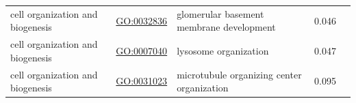 \documentclass[
]{article}
\begin{document}
\begin{longtable}[]{@{}lllll@{}}
\begin{minipage}[t]{0.17\columnwidth}\raggedright
cell organization and biogenesis\strut
\end{minipage} & \begin{minipage}[t]{0.17\columnwidth}\raggedright
\url{GO:0032836}\strut
\end{minipage} & \begin{minipage}[t]{0.17\columnwidth}\raggedright
glomerular basement membrane development\strut
\end{minipage} & \begin{minipage}[t]{0.17\columnwidth}\raggedright
0.046\strut
\end{minipage} & \begin{minipage}[t]{0.17\columnwidth}\raggedright
\strut
\end{minipage}\tabularnewline
\begin{minipage}[t]{0.17\columnwidth}\raggedright
cell organization and biogenesis\strut
\end{minipage} & \begin{minipage}[t]{0.17\columnwidth}\raggedright
\url{GO:0007040}\strut
\end{minipage} & \begin{minipage}[t]{0.17\columnwidth}\raggedright
lysosome organization\strut
\end{minipage} & \begin{minipage}[t]{0.17\columnwidth}\raggedright
0.047\strut
\end{minipage} & \begin{minipage}[t]{0.17\columnwidth}\raggedright
\strut
\end{minipage}\tabularnewline
\begin{minipage}[t]{0.17\columnwidth}\raggedright
cell organization and biogenesis\strut
\end{minipage} & \begin{minipage}[t]{0.17\columnwidth}\raggedright
\url{GO:0031023}\strut
\end{minipage} & \begin{minipage}[t]{0.17\columnwidth}\raggedright
microtubule organizing center organization\strut
\end{minipage} & \begin{minipage}[t]{0.17\columnwidth}\raggedright
0.095\strut
\end{minipage} & \begin{minipage}[t]{0.17\columnwidth}\raggedright
\strut
\end{minipage}\tabularnewline

\end{longtable}
\end{document}
